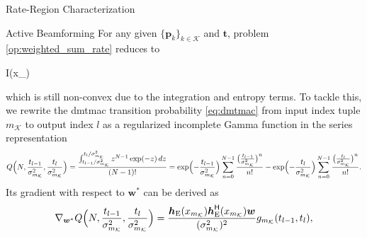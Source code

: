 \documentclass[journal,12pt,onecolumn,draftclsnofoot]{IEEEtran}
\theoremstyle{remark}
\begin{document}
\begin{section}{Rate-Region Characterization}
	\begin{subsection}{Active Beamforming}
		For any given $\{\boldsymbol{p}_k\}_{k \in \mathcal{K}}$ and $\boldsymbol{t}$, problem \eqref{op:weighted_sum_rate} reduces to
		\begin{maxi!}
			{}{I(x_{})}{\label{op:active_beamforming}}{\label{ob:active_beamforming}}
			\addConstraint{\eqref{co:transmit_power},}
		\end{maxi!}
		which is still non-convex due to the integration and entropy terms.
		To tackle this, we rewrite the \gls{dmtmac} transition probability \eqref{eq:dmtmac} from input index tuple $m_{\mathcal{K}}$ to output index $l$ as a regularized incomplete Gamma function in the series representation \cite[Theorem 3]{Jameson2016}
		\begin{equation}
			Q\Bigl(N,\frac{t_{l-1}}{\sigma_{m_{\mathcal{K}}}^2},\frac{t_l}{\sigma_{m_{\mathcal{K}}}^2}\Bigr) = \frac{\int_{{t_{l-1}}/{\sigma_{m_{\mathcal{K}}}^2}}^{{t_l}/{\sigma_{m_{\mathcal{K}}}^2}} z^{N-1} \exp(-z) \, d z}{(N-1)!} = \exp \Bigl(-\frac{t_{l-1}}{\sigma_{m_{\mathcal{K}}}^2}\Bigr) \sum_{n=0}^{N-1} \frac{\bigl(\frac{t_{l-1}}{\sigma_{m_{\mathcal{K}}}^2}\bigr)^n}{n!} - \exp \Bigl(-\frac{t_l}{\sigma_{m_{\mathcal{K}}}^2}\Bigr) \sum_{n=0}^{N-1} \frac{\bigl(\frac{t_l}{\sigma_{m_{\mathcal{K}}}^2}\bigr)^n}{n!}.
			\label{eq:regularized_incomplete_gamma}
		\end{equation}
		Its gradient with respect to $\boldsymbol{w}^*$ can be derived as
		\begin{equation}
			\nabla_{\boldsymbol{w}^*} Q\Bigl(N,\frac{t_{l-1}}{\sigma_{m_{\mathcal{K}}}^2},\frac{t_l}{\sigma_{m_{\mathcal{K}}}^2}\Bigr) = \frac{\boldsymbol{h}_{\text{E}}(x_{m_{\mathcal{K}}})\boldsymbol{h}_{\text{E}}^\mathsf{H}(x_{m_{\mathcal{K}}})\boldsymbol{w}}{(\sigma_{m_{\mathcal{K}}}^2)^2} g_{m_{\mathcal{K}}}(t_{l-1},t_l),

\end{equation}
\end{subsection}
\end{section}
\end{document}
